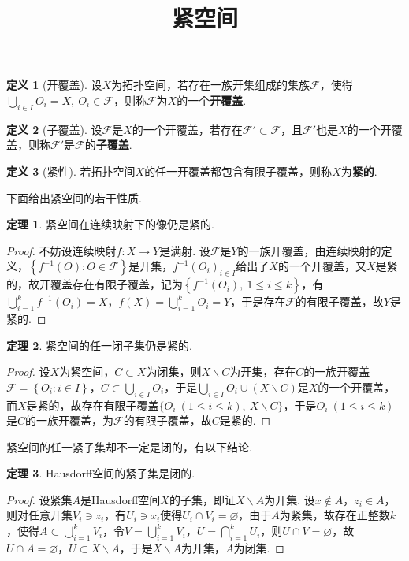 \documentclass[12pt]{ctexart}
\title{\vspace{-2em}\textbf{紧空间}\vspace{-2em}}
\date{ }
\theoremstyle{definition}
\newtheorem{definition}{定义}
\newtheorem{theorem}{定理}
\theoremstyle{plain}
\begin{document}
	\maketitle
	\begin{definition}[开覆盖]
		设$X$为拓扑空间，若存在一族开集组成的集族$\mathcal{F}$，使得$\bigcup_{i\in I}O_i=X,\ O_i\in\mathcal{F}$，则称$\mathcal{F}$为$X$的一个\textbf{开覆盖}.
	\end{definition}
	\begin{definition}[子覆盖]
		设$\mathcal{F}$是$X$的一个开覆盖，若存在$\mathcal{F}'\subset\mathcal{F}$，且$\mathcal{F}'$也是$X$的一个开覆盖，则称$\mathcal{F}'$是$\mathcal{F}$的\textbf{子覆盖}.
	\end{definition}
	\begin{definition}[紧性]
		若拓扑空间$X$的任一开覆盖都包含有限子覆盖，则称$X$为\textbf{紧的}.
	\end{definition}
	下面给出紧空间的若干性质.
	\begin{theorem}\label{compact}
		紧空间在连续映射下的像仍是紧的.
	\end{theorem}
	\begin{proof}
		不妨设连续映射$f:X\to Y$是满射. 设$\mathcal{F}$是$Y$的一族开覆盖，由连续映射的定义，$\left\{f^{-1}(O):O\in\mathcal{F}\right\}$是开集，$f^{-1}(O_i)_{i\in I}$给出了$X$的一个开覆盖，又$X$是紧的，故开覆盖存在有限子覆盖，记为$\left\{f^{-1}(O_i),\ 1\leqslant i\leqslant k\right\}$，有$\bigcup_{i=1}^{k}f^{-1}(O_i)=X$，$f(X)=\bigcup_{i=1}^{k}O_i=Y$，于是存在$\mathcal{F}$的有限子覆盖，故$Y$是紧的.
	\end{proof}
	\begin{theorem}\label{close}
		紧空间的任一闭子集仍是紧的.
	\end{theorem}
	\begin{proof}
		设$X$为紧空间，$C\subset X$为闭集，则$X\backslash C$为开集，存在$C$的一族开覆盖$\mathcal{F}=\left\{O_i:i\in I\right\}$，$C\subset\bigcup_{i\in I}O_i$，于是$\bigcup_{i\in I}O_i\cup(X\backslash C)$是$X$的一个开覆盖，而$X$是紧的，故存在有限子覆盖$\{O_i\ (1\leqslant i\leqslant k),\ X\backslash C\}$，于是$O_i\ (1\leqslant i\leqslant k)$是$C$的一族开覆盖，为$\mathcal{F}$的有限子覆盖，故$C$是紧的.
	\end{proof}
	紧空间的任一紧子集却不一定是闭的，有以下结论.
	\begin{theorem}\label{Hcom}
		Hausdorff空间的紧子集是闭的.
	\end{theorem}
	\begin{proof}
		设紧集$A$是Hausdorff空间$X$的子集，即证$X\backslash A$为开集.
		设$x\notin A$，$z_i\in A$，则对任意开集$V_i\ni z_i$，有$U_i\ni x_i$使得$U_i\cap V_i=\varnothing$，由于$A$为紧集，故存在正整数$k$，使得$A\subset\bigcup_{i=1}^{k}V_i$，令$V=\bigcup_{i=1}^{k}V_i$，$U=\bigcap_{i=1}^{k}U_i$，则$U\cap V=\varnothing$，故$U\cap A=\varnothing$，$U\subset X\backslash A$，于是$X\backslash A$为开集，$A$为闭集.
	\end{proof}
\end{document}
